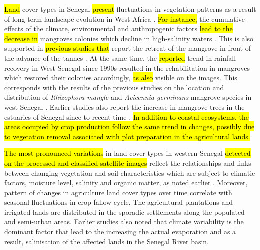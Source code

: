 \documentclass[earth,article,submit,pdftex,moreauthors]{Definitions/mdpi}
\begin{document}
\hl{Land} cover types in Senegal \hl{present } fluctuations in vegetation patterns as a result of long-term landscape evolution in West Africa \cite{Furian,033139ar,LOUM2014100,BRINK2009501}. \hl{For instance, }the cumulative effects of the climate, environmental and anthropogenic factors \hl{lead to the decrease in} mangroves colonies which decline in high-salinity waters \cite{dieye2013dynamique}. This is also supported in \hl{previous studies that} report the retreat of the mangrove in front of the advance of the tannes \cite{Lebigre}. At the same time, the \hl{reported }trend in rainfall recovery in West Senegal since 1990s \cite{andrieu2020botanical} resulted in the rehabilitation in mangroves which restored their colonies accordingly, \hl{as also }visible on the images. This corresponds with the results of the previous studies on the location and distribution of \emph{Rhizophora mangle} and \emph{Avicennia germinans} mangrove species in west Senegal \cite{Diaw,rs13101961}. Earlier studies also report the increase in mangrove trees in the estuaries of Senegal since to recent time \cite{FENT2019214}. \hl{In addition to coastal ecosystems, the areas occupied by crop production follow the same trend in changes, possibly due to vegetation removal associated with plot preparation in the agricultural lands.}

\hl{The most pronounced variations} in land cover types in western Senegal \hl{detected on the processed and classified satellite images }reflect the relationships and links between changing vegetation and soil characteristics which are subject to climatic factors, moisture level, salinity and organic matter, as noted earlier \cite{MANLAY200089}. Moreover, pattern of changes in agriculture land cover types over time correlate with seasonal fluctuations in crop-fallow cycle. The agricultural plantations and irrigated lands are distributed in the sporadic settlements along the populated and semi-urban areas. Earlier studies also noted \cite{BENNOUR2023101370} that climate variability is the dominant factor that lead to the increasing the actual evaporation and as a result, salinisation of the affected lands in the Senegal River basin. 
\end{document}
